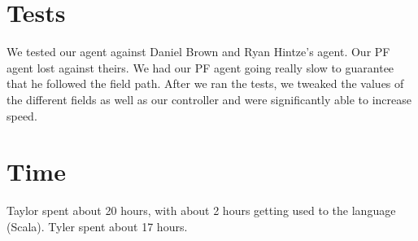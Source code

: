 \documentclass[11pt]{article}
\begin{document}
\section{Tests}
We tested our agent against Daniel Brown and Ryan Hintze's agent.
Our PF agent lost against theirs.
We had our PF agent going really slow to guarantee that he followed the field path.
After we ran the tests, we tweaked the values of the different fields as well as our controller and were significantly able to increase speed.

\section{Time}
Taylor spent about 20 hours, with about 2 hours getting used to the language (Scala).
Tyler spent about 17 hours.
\end{document}
